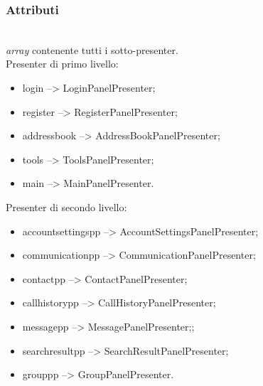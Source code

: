 \subsubsection*{Attributi}
\begin{description}
\item{}\\
  \textit{array} contenente tutti i sotto-presenter.\\
  Presenter di primo livello:
  \begin{itemize}
  \item login --> LoginPanelPresenter;
  \item register --> RegisterPanelPresenter;
  \item addressbook --> AddressBookPanelPresenter;
  \item tools --> ToolsPanelPresenter;
  \item main --> MainPanelPresenter.
  \end{itemize}
  Presenter di secondo livello:
  \begin{itemize}
  \item accountsettingspp --> AccountSettingsPanelPresenter;
  \item communicationpp --> CommunicationPanelPresenter;
  \item contactpp --> ContactPanelPresenter;
  \item callhistorypp --> CallHistoryPanelPresenter;
  \item messagepp --> MessagePanelPresenter;;
  \item searchresultpp --> SearchResultPanelPresenter;
  \item grouppp --> GroupPanelPresenter.
  \end{itemize}
\end{description}

